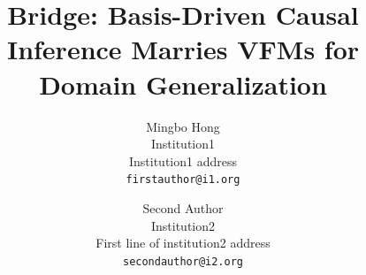 \documentclass[10pt,twocolumn,letterpaper]{article}
\title{Bridge: Basis-Driven Causal Inference Marries VFMs for Domain Generalization}
\author{Mingbo Hong\\
Institution1\\
Institution1 address\\
{\tt\small firstauthor@i1.org}
\and
Second Author\\
Institution2\\
First line of institution2 address\\
{\tt\small secondauthor@i2.org}
}
\begin{document}
\maketitle
    





{
    \small
    
    
}

% 
\end{document}
